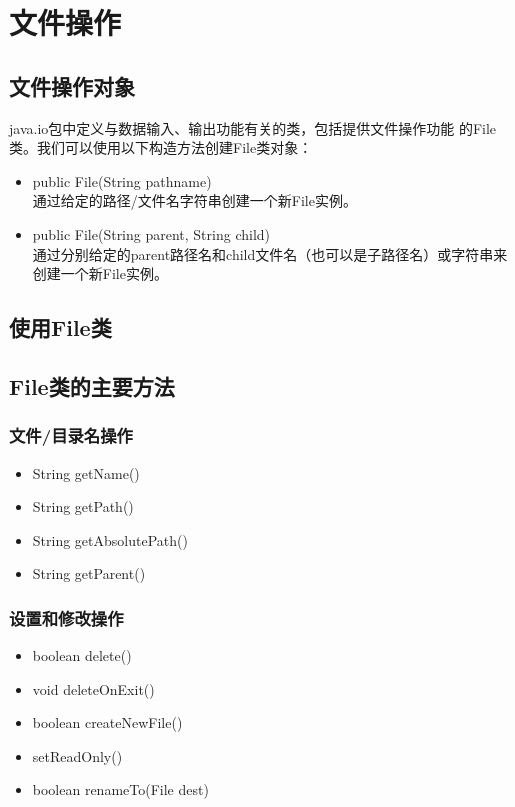 \section{文件操作}

\subsection{文件操作对象}

java.io包中定义与数据输入、输出功能有关的类，包括提供文件操作功能
的File类。我们可以使用以下构造方法创建File类对象：

\begin{itemize}
\item public File(String pathname)\\
  通过给定的路径/文件名字符串创建一个新File实例。
\item public File(String parent, String child)\\
  通过分别给定的parent路径名和child文件名（也可以是子路径名）或字符串来
  创建一个新File实例。
\end{itemize}

\subsection{使用File类}


\subsection{File类的主要方法} 

\subsubsection{文件/目录名操作}

\begin{itemize}
\item String getName() 
\item String getPath() 
\item String getAbsolutePath() 
\item String getParent()
\end{itemize}

\subsubsection{设置和修改操作} 
    
\begin{itemize}
\item boolean delete() 
\item void deleteOnExit() 
\item boolean createNewFile() 
\item setReadOnly() 
\item boolean renameTo(File dest)
\end{itemize}

